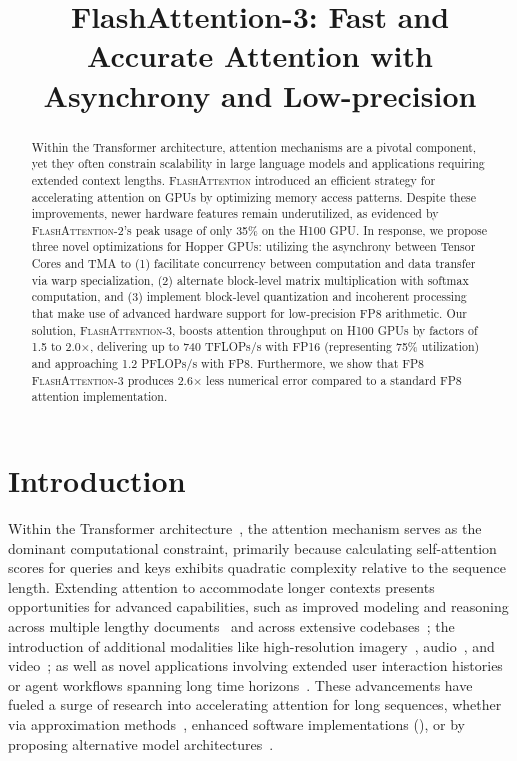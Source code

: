 \title{FlashAttention-3: Fast and Accurate Attention with Asynchrony and Low-precision}

\begin{abstract}
Within the Transformer architecture, attention mechanisms are a pivotal component, yet they often constrain scalability in large language models and applications requiring extended context lengths. \textsc{FlashAttention} introduced an efficient strategy for accelerating attention on GPUs by optimizing memory access patterns. Despite these improvements, newer hardware features remain underutilized, as evidenced by \textsc{FlashAttention-2}'s peak usage of only 35\% on the H100 GPU. In response, we propose three novel optimizations for Hopper GPUs: utilizing the asynchrony between Tensor Cores and TMA to (1) facilitate concurrency between computation and data transfer via warp specialization, (2) alternate block-level matrix multiplication with softmax computation, and (3) implement block-level quantization and incoherent processing that make use of advanced hardware support for low-precision FP8 arithmetic. Our solution, \textsc{FlashAttention-3}, boosts attention throughput on H100 GPUs by factors of 1.5 to 2.0$\times$, delivering up to 740 TFLOPs/s with FP16 (representing 75\% utilization) and approaching 1.2 PFLOPs/s with FP8. Furthermore, we show that FP8 \textsc{FlashAttention-3} produces 2.6$\times$ less numerical error compared to a standard FP8 attention implementation.
\end{abstract}

\section{Introduction}
\label{sec:intro}

Within the Transformer architecture~\citep{vaswani2017attention}, the attention mechanism serves as the dominant computational constraint, primarily because calculating self-attention scores for queries and keys exhibits quadratic complexity relative to the sequence length. Extending attention to accommodate longer contexts presents opportunities for advanced capabilities, such as improved modeling and reasoning across multiple lengthy documents~\citep{guo2021longt5,shaham2022scrolls,peng2023yarn} and across extensive codebases~\citep{roziere2023code, li2023starcoder}; the introduction of additional modalities like high-resolution imagery~\citep{chen2022scaling}, audio~\citep{gulati2020conformer}, and video~\citep{ho2022video}; as well as novel applications involving extended user interaction histories~\citep{sun2019bert4rec} or agent workflows spanning long time horizons~\citep{yao2022react}. These advancements have fueled a surge of research into accelerating attention for long sequences, whether via approximation methods~\citep{katharopoulos2020transformers,choromanski2020rethinking,
tay2020efficient}, enhanced software implementations (\citep{rabe2021self,dao2022flashattention,kwon2023efficient}), or by proposing alternative model architectures~\citep{peng2023rwkv,sun2023retentive,gu2023mamba}.

